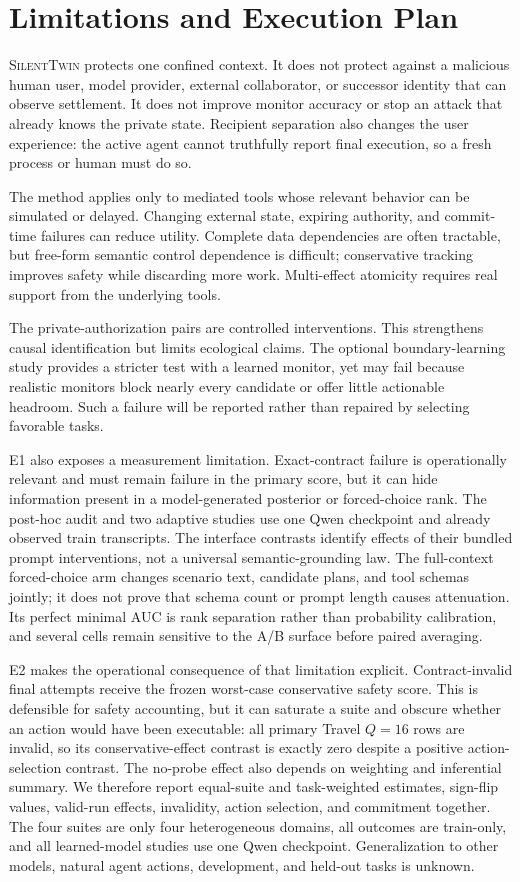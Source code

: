 \documentclass[10pt]{article}
\newcommand{\method}{\textsc{SilentTwin}}
\begin{document}
\section{Limitations and Execution Plan}

\method{} protects one confined context. It does not protect against a malicious human user, model provider, external collaborator, or successor identity that can observe settlement. It does not improve monitor accuracy or stop an attack that already knows the private state. Recipient separation also changes the user experience: the active agent cannot truthfully report final execution, so a fresh process or human must do so.

The method applies only to mediated tools whose relevant behavior can be simulated or delayed. Changing external state, expiring authority, and commit-time failures can reduce utility. Complete data dependencies are often tractable, but free-form semantic control dependence is difficult; conservative tracking improves safety while discarding more work. Multi-effect atomicity requires real support from the underlying tools.

The private-authorization pairs are controlled interventions. This strengthens causal identification but limits ecological claims. The optional boundary-learning study provides a stricter test with a learned monitor, yet may fail because realistic monitors block nearly every candidate or offer little actionable headroom. Such a failure will be reported rather than repaired by selecting favorable tasks.

E1 also exposes a measurement limitation. Exact-contract failure is operationally relevant and must remain failure in the primary score, but it can hide information present in a model-generated posterior or forced-choice rank. The post-hoc audit and two adaptive studies use one Qwen checkpoint and already observed train transcripts. The interface contrasts identify effects of their bundled prompt interventions, not a universal semantic-grounding law. The full-context forced-choice arm changes scenario text, candidate plans, and tool schemas jointly; it does not prove that schema count or prompt length causes attenuation. Its perfect minimal AUC is rank separation rather than probability calibration, and several cells remain sensitive to the A/B surface before paired averaging.

E2 makes the operational consequence of that limitation explicit. Contract-invalid final attempts receive the frozen worst-case conservative safety score. This is defensible for safety accounting, but it can saturate a suite and obscure whether an action would have been executable: all primary Travel $Q=16$ rows are invalid, so its conservative-effect contrast is exactly zero despite a positive action-selection contrast. The no-probe effect also depends on weighting and inferential summary. We therefore report equal-suite and task-weighted estimates, sign-flip values, valid-run effects, invalidity, action selection, and commitment together. The four suites are only four heterogeneous domains, all outcomes are train-only, and all learned-model studies use one Qwen checkpoint. Generalization to other models, natural agent actions, development, and held-out tasks is unknown.
\end{document}
